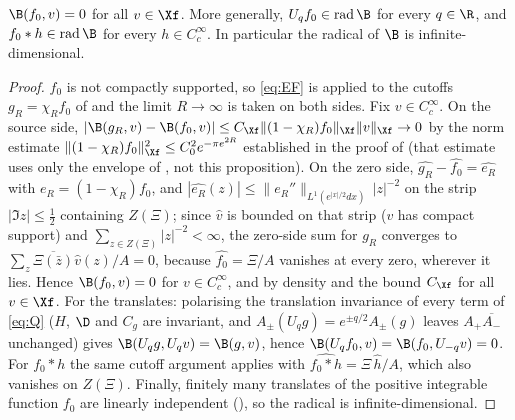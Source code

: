 \begin{proposition}\label{prop:radical}
$\B(f_0,v)=0$ for all $v\in\Xf$. More generally, $U_qf_0\in\operatorname{rad}\B$ for every $q\in\R$, and
$f_0*h\in\operatorname{rad}\B$ for every $h\in C_c^\infty$. In particular the radical of $\B$ is infinite-dimensional.
\end{proposition}
\begin{proof}
$f_0$ is not compactly supported, so \eqref{eq:EF} is applied to the cutoffs $g_R=\chi_Rf_0$ of  and the limit
$R\to\infty$ is taken on both sides. Fix $v\in C_c^\infty$. On the source side, $|\B(g_R,v)-\B(f_0,v)|\le C_{\Xf}\|(1-\chi_R)f_0\|_{\Xf}\|v\|_{\Xf}\to0$
by the norm estimate $\|(1-\chi_R)f_0\|_{\Xf}^2\le C_0^2e^{-\pi e^{2R}}$ established in the proof of  (that estimate uses only the
envelope of , not this proposition). On the zero side, $\widehat{g_R}-\widehat{f_0}=\widehat{e_R}$ with $e_R=(1-\chi_R)f_0$, and
$|\widehat{e_R}(z)|\le\|e_R''\|_{L^1(e^{|x|/2}dx)}\,|z|^{-2}$ on the strip $|\Im z|\le\tfrac12$ containing $Z(\Xi)$; since $\widehat v$ is
bounded on that strip ($v$ has compact support) and $\sum_{z\in Z(\Xi)}|z|^{-2}<\infty$, the zero-side sum for $g_R$ converges to
$\sum_z\overline{\Xi(\bar z)}\widehat v(z)/A=0$, because $\widehat{f_0}=\Xi/A$ vanishes at every zero, wherever it lies. Hence
$\B(f_0,v)=0$ for $v\in C_c^\infty$, and by density and the bound $C_{\Xf}$ for all $v\in\Xf$. For the translates: polarising the
translation invariance of every term of \eqref{eq:Q} ($H$, $\D$ and $C_g$ are invariant, and $A_\pm(U_qg)=e^{\pm q/2}A_\pm(g)$ leaves
$A_+\overline{A_-}$ unchanged) gives $\B(U_qg,U_qv)=\B(g,v)$, hence $\B(U_qf_0,v)=\B(f_0,U_{-q}v)=0$. For $f_0*h$ the same cutoff
argument applies with $\widehat{f_0*h}=\Xi\,\widehat h/A$, which also vanishes on $Z(\Xi)$. Finally, finitely many translates of the
positive integrable function $f_0$ are linearly independent (), so the radical is infinite-dimensional.
\end{proof}

